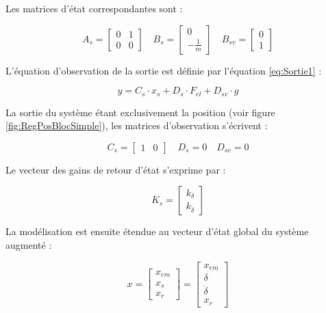 Les matrices d'état correspondantes sont :

\begin{equation}
    A_s = \begin{bmatrix} 0 & 1 \\ 0 & 0 \end{bmatrix} \quad B_s = \begin{bmatrix} 0 \\ -\frac{1}{m} \end{bmatrix}\quad B_{sv} = \begin{bmatrix} 0 \\ 1 \end{bmatrix}
\end{equation}

L'équation d'observation de la sortie est définie par l'équation \ref{eq:Sortie1} :

\begin{equation}
    y = C_s \cdot x_s + D_s \cdot F_{el} + D_{sv} \cdot g
    \label{eq:Sortie1}
\end{equation}

La sortie du système étant exclusivement la position (voir figure \ref{fig:RegPosBlocSimple}), les matrices d'observation s'écrivent :

\begin{equation}
    C_s = \begin{bmatrix} 1 & 0 \end{bmatrix} \quad D_s =  0 \quad D_{sv} =  0
\end{equation}

Le vecteur des gains de retour d'état s'exprime par :

\begin{equation}
    K_s = \begin{bmatrix} k_\delta \\ k_{\dot{\delta}} \end{bmatrix}
\end{equation}

La modélisation est ensuite étendue au vecteur d'état global du système augmenté :

\begin{equation}
    x = \begin{bmatrix} x_{em} \\ x_s \\ x_r \end{bmatrix} = \begin{bmatrix} x_{em} \\ \delta \\ \dot{\delta} \\ x_r \end{bmatrix}
\end{equation}

